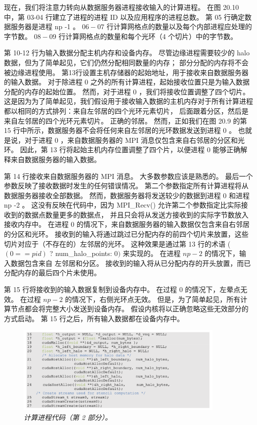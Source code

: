 现在，我们将注意力转向从数据服务器进程接收输入的计算进程。 
在图 20.10 中，第 03-04 行建立了进程的进程 ID 以及应用程序的进程总数。 第 05 行确定数据服务器是进程 np -1 。 
$06-07$ 行计算网格点的数量以及每个内部进程应处理的字节数。 $08-09$ 行计算网格点的数量和每个光环（4 个切片）中的字节数。

第 10-12 行为输入数据分配主机内存和设备内存。 
尽管边缘进程需要较少的 halo 数据，但为了简单起见，它们仍然分配相同数量的内存； 部分分配的内存将不会被边缘进程使用。 
第13行设置主机存储器的起始地址，用于接收来自数据服务器的输入数据。 
对于除进程 0 之外的所有计算进程，起始接收位置只是为输入数据分配的内存的起始位置。 
然而，对于进程 0 ，我们将接收位置调整了四个切片。 
这是因为为了简单起见，我们假设用于接收输入数据的主机内存对于所有计算进程都以相同的方式排列：来自左邻居的四个光环元素切片，
后面跟着分区，然后是来自左邻居的四个光环元素切片。 正确的邻居。 
然而，正如我们在图 20.9 的第 15 行中所示，数据服务器不会将任何来自左邻居的光环数据发送到进程 0 。 
也就是说，对于进程 0 ，来自数据服务器的 MPI 消息仅包含来自右邻居的分区和光环。 
因此，第 13 行将起始主机内存位置调整了四个片，以便进程 0 能够正确解释来自数据服务器的输入数据。

第 14 行接收来自数据服务器的 MPI 消息。 大多数参数应该是熟悉的。 最后一个参数反映了接收数据时发生的任何错误情况。 
第二个参数指定所有计算进程将从数据服务器接收全部数据。 
然而，数据服务器将发送较少的数据到进程 0 和进程 $\mathrm{np}$ -2 。 
这没有反映在代码中，因为 MPI\_Recv() 允许第二个参数指定比实际接收到的数据点数量更多的数据点，
并且只会将从发送方接收到的实际字节数放入接收内存中。 
在进程 0 的情况下，来自数据服务器的输入数据仅包含来自右邻居的分区和光环。 
接收到的输入将通过跳过已分配内存的前四个切片来放置，这些切片对应于（不存在的）左邻居的光环。 
这种效果是通过第 13 行的术语 ( $(0==p i d)$ ? num\_halo\_points: 0$)$ 来实现的。
在进程 $n p-2$ 的情况下，输入数据包含来自 左邻居和分区。 
接收到的输入将从已分配内存的开头放置，而已分配内存的最后四个片未使用。

第 15 行将接收到的输入数据复制到设备内存中。 在过程 0 的情况下，左晕点无效。 在过程 $n p-2$ 的情况下，右侧光环点无效。 
但是，为了简单起见，所有计算节点都会将完整大小发送到设备内存。 假设内核将以正确忽略这些无效部分的方式启动。 
第 15 行之后，所有输入数据都在设备内存中。

\begin{figure}[H]
	\centering
	\includegraphics[width=0.9\textwidth]{figs/F20.11.png}
	\caption{\textit{计算进程代码（第 2 部分）。}}
\end{figure}

